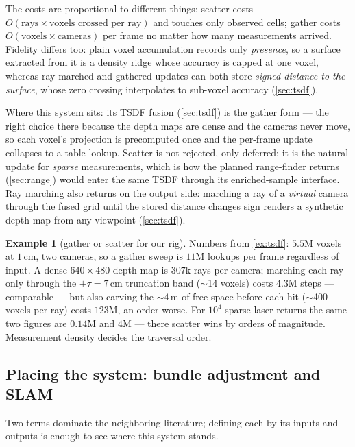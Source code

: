 \documentclass[11pt]{article}
\theoremstyle{definition}
\newtheorem{example}{Example}
\begin{document}
The costs are proportional to different things: scatter costs
$O(\text{rays}\times\text{voxels crossed per ray})$ and touches only
observed cells; gather costs $O(\text{voxels}\times\text{cameras})$ per
frame no matter how many measurements arrived. Fidelity differs too:
plain voxel accumulation records only \emph{presence}, so a surface
extracted from it is a density ridge whose accuracy is capped at one
voxel, whereas ray-marched and gathered updates can both store
\emph{signed distance to the surface}, whose zero crossing interpolates
to sub-voxel accuracy (\autoref{sec:tsdf}).

Where this system sits: its TSDF fusion (\autoref{sec:tsdf}) is the
gather form --- the right choice there because the depth maps are dense
and the cameras never move, so each voxel's projection is precomputed
once and the per-frame update collapses to a table lookup. Scatter is
not rejected, only deferred: it is the natural update for \emph{sparse}
measurements, which is how the planned range-finder returns
(\autoref{sec:range}) would enter the same TSDF through its
enriched-sample interface. Ray marching also returns on the output
side: marching a ray of a \emph{virtual} camera through the fused grid
until the stored distance changes sign renders a synthetic depth map
from any viewpoint (\autoref{sec:tsdf}).

\begin{example}[gather or scatter for our rig]
\label{ex:gatherscatter}
Numbers from \autoref{ex:tsdf}: $5.5$M voxels at $1$\,cm, two cameras,
so a gather sweep is $11$M lookups per frame regardless of input. A
dense $640\times480$ depth map is $307$k rays per camera; marching each
ray only through the $\pm\tau=7$\,cm truncation band ($\sim$14 voxels)
costs $4.3$M steps --- comparable --- but also carving the $\sim4$\,m of
free space before each hit ($\sim$400 voxels per ray) costs $123$M,
an order worse. For $10^4$ sparse laser returns the same two figures
are $0.14$M and $4$M --- there scatter wins by orders of magnitude.
Measurement density decides the traversal order.
\end{example}

\subsection{Placing the system: bundle adjustment and SLAM}
\label{sec:slamba}

Two terms dominate the neighboring literature; defining each by its
inputs and outputs is enough to see where this system stands.
\end{document}
